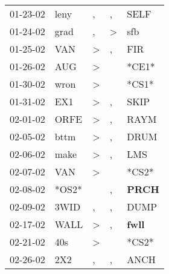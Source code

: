 \begin{supertabular}{p{0.07\textwidth}p{0.06\textwidth}p{0.02\textwidth}p{0.02\textwidth}p{0.06\textwidth}}
 01-23-02\textsuperscript{} &           leny\textsuperscript{} &             , &             , &           SELF\textsuperscript{} \\
 01-24-02\textsuperscript{} &           grad\textsuperscript{} &             , &  \textgreater &            sfb\textsuperscript{} \\
 01-25-02\textsuperscript{} &            VAN\textsuperscript{} &  \textgreater &             , &            FIR\textsuperscript{} \\
 01-26-02\textsuperscript{} &            AUG\textsuperscript{} &  \textgreater &               &                            *CE1* \\
 01-30-02\textsuperscript{} &           wron\textsuperscript{} &  \textgreater &               &                            *CS1* \\
 01-31-02\textsuperscript{} &            EX1\textsuperscript{} &  \textgreater &             , &           SKIP\textsuperscript{} \\
 02-01-02\textsuperscript{} &           ORFE\textsuperscript{} &  \textgreater &             , &           RAYM\textsuperscript{} \\
 02-05-02\textsuperscript{} &           bttm\textsuperscript{} &  \textgreater &             , &           DRUM\textsuperscript{} \\
 02-06-02\textsuperscript{} &           make\textsuperscript{} &  \textgreater &             , &            LMS\textsuperscript{} \\
 02-07-02\textsuperscript{} &            VAN\textsuperscript{} &  \textgreater &               &                            *CS2* \\
 02-08-02\textsuperscript{} &                            *OS2* &               &             , &  \textbf{PRCH\textsuperscript{}} \\
 02-09-02\textsuperscript{} &           3WID\textsuperscript{} &             , &             , &           DUMP\textsuperscript{} \\
 02-17-02\textsuperscript{} &           WALL\textsuperscript{} &  \textgreater &             , &  \textbf{fwll\textsuperscript{}} \\
 02-21-02\textsuperscript{} &            40s\textsuperscript{} &  \textgreater &               &                            *CS2* \\
 02-26-02\textsuperscript{} &            2X2\textsuperscript{} &             , &             , &           ANCH\textsuperscript{} \\

\end{supertabular}

